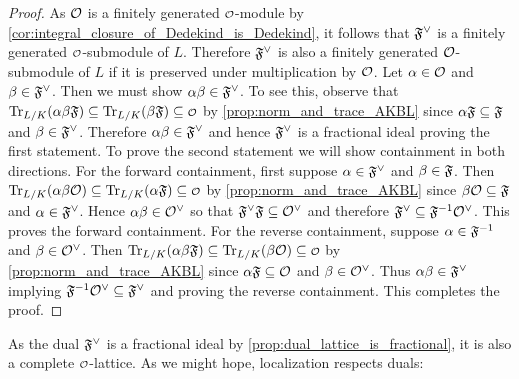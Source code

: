 \begin{proof}
      As $\mathcal{O}$ is a finitely generated $\smc{O}$-module by \cref{cor:integral_closure_of_Dedekind_is_Dedekind}, it follows that $\mathfrak{F}^{\vee}$ is a finitely generated $\smc{O}$-submodule of $L$. Therefore $\mathfrak{F}^{\vee}$ is also a finitely generated $\mathcal{O}$-submodule of $L$ if it is preserved under multiplication by $\mathcal{O}$. Let $\alpha \in \mathcal{O}$ and $\beta \in \mathfrak{F}^{\vee}$. Then we must show $\alpha\beta \in \mathfrak{F}^{\vee}$. To see this, observe that $\Trace_{L/K}(\a\b\mf{F}) \subseteq \Trace_{L/K}(\b\mf{F}) \subseteq \smc{O}$ by \cref{prop:norm_and_trace_AKBL} since $\alpha\mathfrak{F} \subseteq \mathfrak{F}$ and $\beta \in \mathfrak{F}^{\vee}$. Therefore $\alpha\beta \in \mathfrak{F}^{\vee}$ and hence $\mathfrak{F}^{\vee}$ is a fractional ideal proving the first statement. To prove the second statement we will show containment in both directions. For the forward containment, first suppose $\alpha \in \mathfrak{F}^{\vee}$ and $\beta \in \mathfrak{F}$. Then $\Trace_{L/K}(\a\b\mc{O}) \subseteq \Trace_{L/K}(\a\mf{F}) \subseteq \smc{O}$ by \cref{prop:norm_and_trace_AKBL} since $\beta\mathcal{O} \subseteq \mathfrak{F}$ and $\alpha \in \mathfrak{F}^{\vee}$. Hence $\alpha\beta \in \mathcal{O}^{\vee}$ so that $\mathfrak{F}^{\vee}\mathfrak{F} \subseteq \mathcal{O}^{\vee}$ and therefore $\mathfrak{F}^{\vee} \subseteq \mathfrak{F}^{-1}\mathcal{O}^{\vee}$. This proves the forward containment. For the reverse containment, suppose $\alpha \in \mathfrak{F}^{-1}$ and $\beta \in \mathcal{O}^{\vee}$. Then $\Trace_{L/K}(\a\b\mf{F}) \subseteq \Trace_{L/K}(\b\mc{O}) \subseteq \smc{O}$ by \cref{prop:norm_and_trace_AKBL} since $\alpha\mathfrak{F} \subseteq \mathcal{O}$ and $\beta \in \mathcal{O}^{\vee}$. Thus $\alpha\beta \in \mathfrak{F}^{\vee}$ implying $\mathfrak{F}^{-1}\mathcal{O}^{\vee} \subseteq \mathfrak{F}^{\vee}$ and proving the reverse containment. This completes the proof.
    \end{proof}

    As the dual $\mathfrak{F}^{\vee}$ is a fractional ideal by \cref{prop:dual_lattice_is_fractional}, it is also a complete $\smc{O}$-lattice. As we might hope, localization respects duals:

